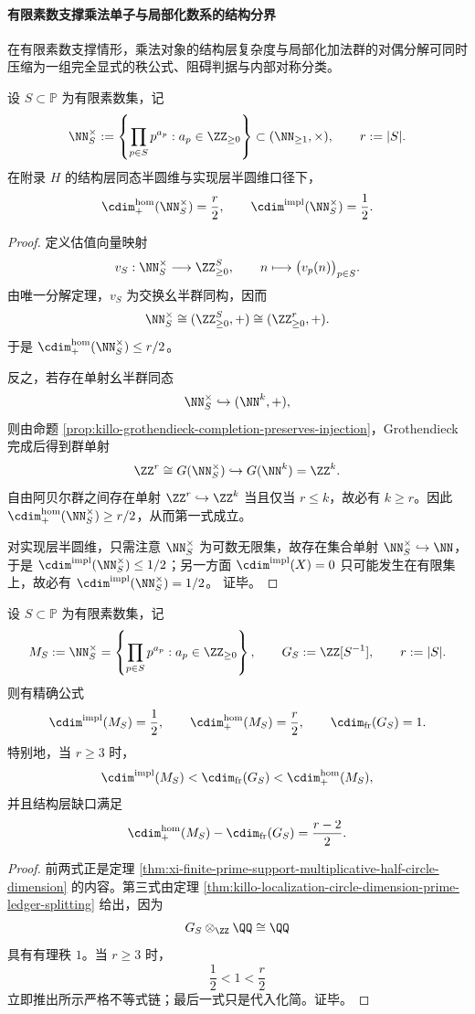 \paragraph{有限素数支撑乘法单子与局部化数系的结构分界}
在有限素数支撑情形，乘法对象的结构层复杂度与局部化加法群的对偶分解可同时压缩为一组完全显式的秩公式、阻碍判据与内部对称分类。

\begin{theorem}[有限素数支撑乘法单子的结构层同态半圆维公式]\label{thm:xi-finite-prime-support-multiplicative-half-circle-dimension}
设 \(S\subset\mathbb P\) 为有限素数集，记
\[
\NN_S^\times:=\left\{\prod_{p\in S}p^{a_p}: a_p\in \ZZ_{\ge 0}\right\}\subset (\NN_{\ge 1},\times),
\qquad
r:=|S|.
\]
在附录 \(H\) 的结构层同态半圆维与实现层半圆维口径下，
\[
\cdim^{\mathrm{hom}}_{+}(\NN_S^\times)=\frac{r}{2},
\qquad
\cdim^{\mathrm{impl}}(\NN_S^\times)=\frac12.
\]
\end{theorem}
\begin{proof}
定义估值向量映射
\[
v_S:\NN_S^\times\longrightarrow \ZZ_{\ge 0}^{S},
\qquad
n\longmapsto \bigl(v_p(n)\bigr)_{p\in S}.
\]
由唯一分解定理，\(v_S\) 为交换幺半群同构，因而
\[
\NN_S^\times\cong (\ZZ_{\ge 0}^{S},+)\cong (\ZZ_{\ge 0}^{r},+).
\]
于是
\(
\cdim^{\mathrm{hom}}_{+}(\NN_S^\times)\le r/2
\)。

反之，若存在单射幺半群同态
\[
\NN_S^\times\hookrightarrow (\NN^k,+),
\]
则由命题 \ref{prop:killo-grothendieck-completion-preserves-injection}，Grothendieck 完成后得到群单射
\[
\ZZ^r\cong G(\NN_S^\times)\hookrightarrow G(\NN^k)=\ZZ^k.
\]
自由阿贝尔群之间存在单射 \(\ZZ^r\hookrightarrow \ZZ^k\) 当且仅当 \(r\le k\)，故必有 \(k\ge r\)。因此
\(
\cdim^{\mathrm{hom}}_{+}(\NN_S^\times)\ge r/2
\)，从而第一式成立。

对实现层半圆维，只需注意 \(\NN_S^\times\) 为可数无限集，故存在集合单射
\(
\NN_S^\times\hookrightarrow \NN
\)，于是
\(
\cdim^{\mathrm{impl}}(\NN_S^\times)\le 1/2
\)；另一方面 \(\cdim^{\mathrm{impl}}(X)=0\) 只可能发生在有限集上，故必有
\(
\cdim^{\mathrm{impl}}(\NN_S^\times)=1/2
\)。
证毕。
\end{proof}

\begin{corollary}[有限素数支撑乘法半群与局部化数系的三层圆维分裂]\label{cor:xi-finite-prime-support-threeway-cdim-split}
设 \(S\subset\mathbb P\) 为有限素数集，记
\[
M_S:=\NN_S^\times
=
\left\{\prod_{p\in S}p^{a_p}:a_p\in\ZZ_{\ge 0}\right\},
\qquad
G_S:=\ZZ[S^{-1}],
\qquad
r:=|S|.
\]
则有精确公式
\[
\cdim^{\mathrm{impl}}(M_S)=\frac12,
\qquad
\cdim^{\mathrm{hom}}_{+}(M_S)=\frac{r}{2},
\qquad
\cdim_{\mathrm{fr}}(G_S)=1.
\]
特别地，当 \(r\ge 3\) 时，
\[
\cdim^{\mathrm{impl}}(M_S)
<
\cdim_{\mathrm{fr}}(G_S)
<
\cdim^{\mathrm{hom}}_{+}(M_S),
\]
并且结构层缺口满足
\[
\cdim^{\mathrm{hom}}_{+}(M_S)-\cdim_{\mathrm{fr}}(G_S)=\frac{r-2}{2}.
\]
\end{corollary}
\begin{proof}
前两式正是定理 \ref{thm:xi-finite-prime-support-multiplicative-half-circle-dimension} 的内容。第三式由定理 \ref{thm:killo-localization-circle-dimension-prime-ledger-splitting} 给出，因为
\[
G_S\otimes_{\ZZ}\QQ\cong \QQ
\]
具有有理秩 \(1\)。当 \(r\ge 3\) 时，
\[
\frac12<1<\frac{r}{2}
\]
立即推出所示严格不等式链；最后一式只是代入化简。证毕。
\end{proof}

